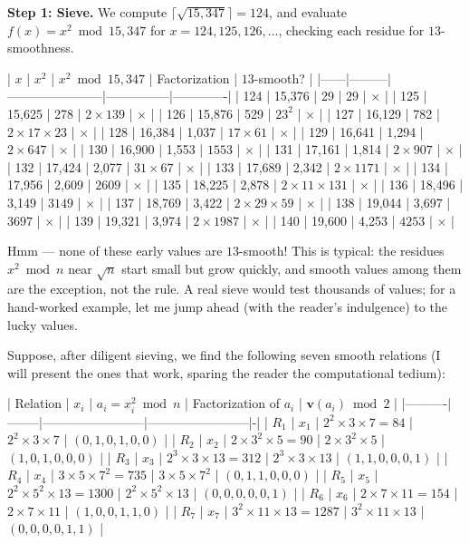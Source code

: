 \documentclass[11pt,openright,twoside]{book}
\theoremstyle{definition}
\begin{document}
\textbf{Step 1: Sieve.} We compute $\lceil \sqrt{15{,}347} \rceil = 124$, and evaluate $f(x) = x^2 \bmod 15{,}347$ for $x = 124, 125, 126, \ldots$, checking each residue for $13$-smoothness.

| $x$  | $x^2$   | $x^2 \bmod 15{,}347$ | Factorization | $13$-smooth? |
|------|---------|-----------------------|---------------|-------------|
| 124  | 15,376  | 29                    | $29$          | {$\times$}           |
| 125  | 15,625  | 278                   | $2 \times 139$ | {$\times$}          |
| 126  | 15,876  | 529                   | $23^2$        | {$\times$}           |
| 127  | 16,129  | 782                   | $2 \times 17 \times 23$ | {$\times$}  |
| 128  | 16,384  | 1,037                 | $17 \times 61$ | {$\times$}          |
| 129  | 16,641  | 1,294                 | $2 \times 647$ | {$\times$}          |
| 130  | 16,900  | 1,553                 | $1553$        | {$\times$}           |
| 131  | 17,161  | 1,814                 | $2 \times 907$ | {$\times$}          |
| 132  | 17,424  | 2,077                 | $31 \times 67$ | {$\times$}          |
| 133  | 17,689  | 2,342                 | $2 \times 1171$ | {$\times$}         |
| 134  | 17,956  | 2,609                 | $2609$        | {$\times$}           |
| 135  | 18,225  | 2,878                 | $2 \times 11 \times 131$ | {$\times$} |
| 136  | 18,496  | 3,149                 | $3149$        | {$\times$}           |
| 137  | 18,769  | 3,422                 | $2 \times 29 \times 59$ | {$\times$}  |
| 138  | 19,044  | 3,697                 | $3697$        | {$\times$}           |
| 139  | 19,321  | 3,974                 | $2 \times 1987$ | {$\times$}         |
| 140  | 19,600  | 4,253                 | $4253$        | {$\times$}           |

Hmm --- none of these early values are $13$-smooth! This is typical: the residues $x^2 \bmod n$ near $\sqrt{n}$ start small but grow quickly, and smooth values among them are the exception, not the rule. A real sieve would test thousands of values; for a hand-worked example, let me jump ahead (with the reader's indulgence) to the lucky values.

Suppose, after diligent sieving, we find the following seven smooth relations (I will present the ones that work, sparing the reader the computational tedium):

| Relation | $x_i$ | $a_i = x_i^2 \bmod n$ | Factorization of $a_i$ | $\mathbf{v}(a_i) \bmod 2$ |
|----------|--------|------------------------|------------------------|-|
| $R_1$ | $x_1$ | $2^2 \times 3 \times 7 = 84$ | $2^2 \times 3 \times 7$ | $(0, 1, 0, 1, 0, 0)$ |
| $R_2$ | $x_2$ | $2 \times 3^2 \times 5 = 90$ | $2 \times 3^2 \times 5$ | $(1, 0, 1, 0, 0, 0)$ |
| $R_3$ | $x_3$ | $2^3 \times 3 \times 13 = 312$ | $2^3 \times 3 \times 13$ | $(1, 1, 0, 0, 0, 1)$ |
| $R_4$ | $x_4$ | $3 \times 5 \times 7^2 = 735$ | $3 \times 5 \times 7^2$ | $(0, 1, 1, 0, 0, 0)$ |
| $R_5$ | $x_5$ | $2^2 \times 5^2 \times 13 = 1300$ | $2^2 \times 5^2 \times 13$ | $(0, 0, 0, 0, 0, 1)$ |
| $R_6$ | $x_6$ | $2 \times 7 \times 11 = 154$ | $2 \times 7 \times 11$ | $(1, 0, 0, 1, 1, 0)$ |
| $R_7$ | $x_7$ | $3^2 \times 11 \times 13 = 1287$ | $3^2 \times 11 \times 13$ | $(0, 0, 0, 0, 1, 1)$ |
\end{document}

